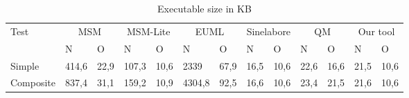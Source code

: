 \begin{table}[]
	\scriptsize
	\centering
	\caption{Executable size in KB}
	\label{table-size}
	\begin{tabular}{|l|l|l|l|l|l|l|l|l|l|l|l|l|}
		\hline
		\multirow{2}{*}{Test} & \multicolumn{2}{c|}{MSM} & \multicolumn{2}{c|}{MSM-Lite} & \multicolumn{2}{c|}{EUML} & \multicolumn{2}{c|}{Sinelabore} & \multicolumn{2}{c|}{QM} & \multicolumn{2}{c|}{Our tool} \\ \cline{2-13} 
		& N           & O          & N              & O            & N            & O          & N              & O              & N          & O          & N            & O           \\ \hline
		Simple                & 414,6       & 22,9       & 107,3          & 10,6         & 2339         & 67,9       & 16,5           & 10,6           & 22,6       & 16,6       & 21,5         & 10,6        \\ \hline
		Composite             & 837,4       & 31,1       & 159,2          & 10,9         & 4304,8       & 92,5       & 16,6           & 10,6           & 23,4       & 21,5       & 21,6         & 10,6        \\ \hline
	\end{tabular}
\end{table}

